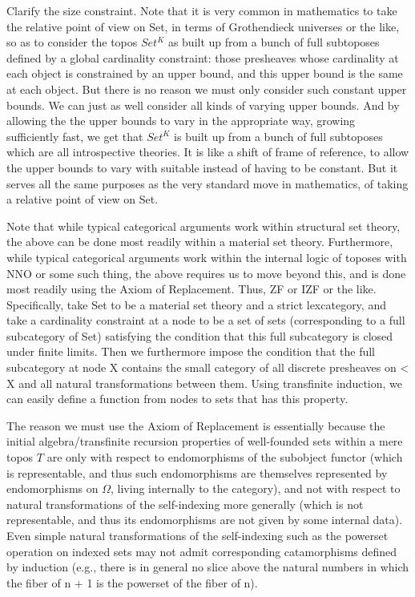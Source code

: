 \begin{TODOblock}
Clarify the size constraint. Note that it is very common in mathematics to take the relative point of view on Set, in terms of Grothendieck universes or the like, so as to consider the topos $Set^K$ as built up from a bunch of full subtoposes defined by a global cardinality constraint: those presheaves whose cardinality at each object is constrained by an upper bound, and this upper bound is the same at each object. But there is no reason we must only consider such constant upper bounds. We can just as well consider all kinds of varying upper bounds. And by allowing the the upper bounds to vary in the appropriate way, growing sufficiently fast, we get that $Set^K$ is built up from a bunch of full subtoposes which are all introspective theories. It is like a shift of frame of reference, to allow the upper bounds to vary with suitable  instead of having to be constant. But it serves all the same purposes as the very standard move in mathematics, of taking a relative point of view on Set.

Note that while typical categorical arguments work within structural set theory, the above can be done most readily within a material set theory. Furthermore, while typical categorical arguments work within the internal logic of toposes with NNO or some such thing, the above requires us to move beyond this, and is done most readily using the Axiom of Replacement. Thus, ZF or IZF or the like. Specifically, take Set to be a material set theory and a strict lexcategory, and take a cardinality constraint at a node to be a set of sets (corresponding to a full subcategory of Set) satisfying the condition that this full subcategory is closed under finite limits. Then we furthermore impose the condition that the full subcategory at node X contains the small category of all discrete presheaves on < X and all natural transformations between them. Using transfinite induction, we can easily define a function from nodes to sets that has this property.

The reason we must use the Axiom of Replacement is essentially because the initial algebra/transfinite recursion properties of well-founded sets within a mere topos $T$ are only with respect to endomorphisms of the subobject functor (which is representable, and thus such endomorphisms are themselves represented by endomorphisms on $\Omega$, living internally to the category), and not with respect to natural transformations of the self-indexing more generally (which is not representable, and thus its endomorphisms are not given by some internal data). Even simple natural transformations of the self-indexing such as the powerset operation on indexed sets may not admit corresponding catamorphisms defined by induction (e.g., there is in general no slice above the natural numbers in which the fiber of n + 1 is the powerset of the fiber of n).
\end{TODOblock}

